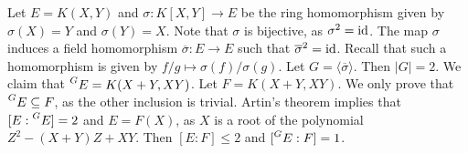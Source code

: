 \begin{example}
    Let $E=K(X,Y)$ and $\sigma\colon K[X,Y]\to E$ be the ring homomorphism given by $\sigma(X)=Y$ and $\sigma(Y)=X$. Note that $\sigma$ is bijective, as $\sigma^2=\operatorname{id}$. The map $\sigma$ induces
    a field homomorphism $\overline{\sigma}\colon E\to E$ such that 
    $\overline{\sigma}^2=\operatorname{id}$. Recall that such a homomorphism is given by 
    $f/g\mapsto \sigma(f)/\sigma(g)$. Let $G=\langle\overline{\sigma}\rangle$. Then $|G|=2$. 
    We claim that $\prescript{G}{}{E}=K(X+Y,XY)$. Let $F=K(X+Y,XY)$. We only prove
    that $\prescript{G}{}{E}\subseteq F$, as the other inclusion is trivial. Artin's theorem
    implies that $[E:\prescript{G}{}{E}]=2$ and $E=F(X)$, as $X$ is a root
    of the polynomial $Z^2-(X+Y)Z+XY$. Then $[E:F]\leq 2$ and $[\prescript{G}{}{E}:F]=1$.
\end{example}
